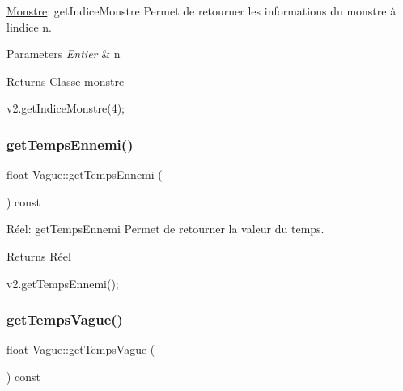 \hyperlink{classMonstre}{Monstre}\+: get\+Indice\+Monstre Permet de retourner les informations du monstre à l\textquotesingle{}indice n. 


\begin{DoxyParams}{Parameters}
{\em Entier} & n \\
\hline
\end{DoxyParams}
\begin{DoxyReturn}{Returns}
Classe monstre 
\begin{DoxyCode}
v2.getIndiceMonstre(4);
\end{DoxyCode}
 
\end{DoxyReturn}
\mbox{\label{classVague_a71f47253f6f4db49d994338a8088985c}} 
\subsubsection{\texorpdfstring{get\+Temps\+Ennemi()}{getTempsEnnemi()}}
{\footnotesize\ttfamily float Vague\+::get\+Temps\+Ennemi (\begin{DoxyParamCaption}{ }\end{DoxyParamCaption}) const}



Réel\+: get\+Temps\+Ennemi Permet de retourner la valeur du temps. 

\begin{DoxyReturn}{Returns}
Réel 
\begin{DoxyCode}
v2.getTempsEnnemi();
\end{DoxyCode}
 
\end{DoxyReturn}
\mbox{\label{classVague_af665b6b2ec76931ebb9d5423446cfee8}} 
\subsubsection{\texorpdfstring{get\+Temps\+Vague()}{getTempsVague()}}
{\footnotesize\ttfamily float Vague\+::get\+Temps\+Vague (\begin{DoxyParamCaption}{ }\end{DoxyParamCaption}) const}



